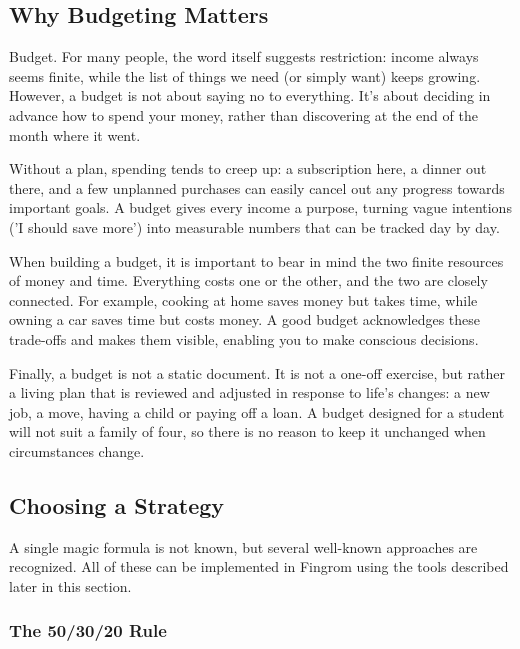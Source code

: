 
\subsection{Why Budgeting Matters}

Budget. For many people, the word itself suggests restriction: income always seems finite,
while the list of things we need (or simply want) keeps growing. However, a budget is not
about saying no to everything. It's about deciding in advance how to spend your money, rather
than discovering at the end of the month where it went.

Without a plan, spending tends to creep up: a subscription here, a dinner out there, and a
few unplanned purchases can easily cancel out any progress towards important goals. A budget
gives every income a purpose, turning vague intentions ('I should save more') into measurable
numbers that can be tracked day by day.

When building a budget, it is important to bear in mind the two finite resources of money and
time. Everything costs one or the other, and the two are closely connected. For example,
cooking at home saves money but takes time, while owning a car saves time but costs money. A
good budget acknowledges these trade-offs and makes them visible, enabling you to make
conscious decisions.

Finally, a budget is not a static document. It is not a one-off exercise, but rather a living
plan that is reviewed and adjusted in response to life's changes: a new job, a move, having a
child or paying off a loan. A budget designed for a student will not suit a family of four,
so there is no reason to keep it unchanged when circumstances change.


\subsection{Choosing a Strategy}

A single magic formula is not known, but several well-known approaches are recognized. All of
these can be implemented in Fingrom using the tools described later in this section.

\subsubsection{The 50/30/20 Rule}

